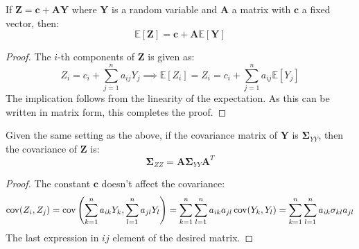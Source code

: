 \begin{proposition}
    If $\boldsymbol Z = \boldsymbol c + \boldsymbol A\boldsymbol Y$ where $\boldsymbol Y$ is a random variable and $\boldsymbol A$ a matrix with $\boldsymbol c$ a fixed vector, then:
    \begin{equation*}
        \mathbb{E}[\boldsymbol Z] = \boldsymbol c + \boldsymbol A \mathbb{E}[\boldsymbol Y]
    \end{equation*}
\end{proposition}
\begin{proof}
    The $i$-th components of $\boldsymbol Z$ is given as:
    \begin{equation*}
        Z_i = c_i + \sum^n_{j=1}a_{ij}Y_j \implies \mathbb{E}[Z_i] = Z_i = c_i + \sum^n_{j=1}a_{ij}\mathbb{E}[Y_j]
    \end{equation*}
    The implication follows from the linearity of the expectation. As this can be written in matrix form, this completes the proof.
\end{proof}

\begin{proposition}
    Given the same setting as the above, if the covariance matrix of $\boldsymbol Y$ is $\boldsymbol \Sigma_{YY}$, then the covariance of $\boldsymbol Z$ is:
    \begin{equation*}
        \boldsymbol \Sigma_{ZZ} = \boldsymbol A\boldsymbol \Sigma_{YY}\boldsymbol A^T
    \end{equation*}
\end{proposition}
\begin{proof}
    The constant $\boldsymbol c$ doesn't affect the covariance:
    \begin{equation*}
    \begin{aligned}
        \operatorname{cov}(Z_i, Z_j) = \operatorname{cov}\left( \sum^n_{k=1}a_{ik}Y_k, \sum^n_{l=1}a_{jl}Y_l \right) = \sum^n_{k=1}\sum^n_{l=1}a_{ik}a_{jl}\operatorname{cov}(Y_k, Y_l) = \sum^n_{k=1}\sum^n_{l=1}a_{ik}\sigma_{kl}a_{jl}
    \end{aligned}
    \end{equation*}
    The last expression in $ij$ element of the desired matrix.
\end{proof}


